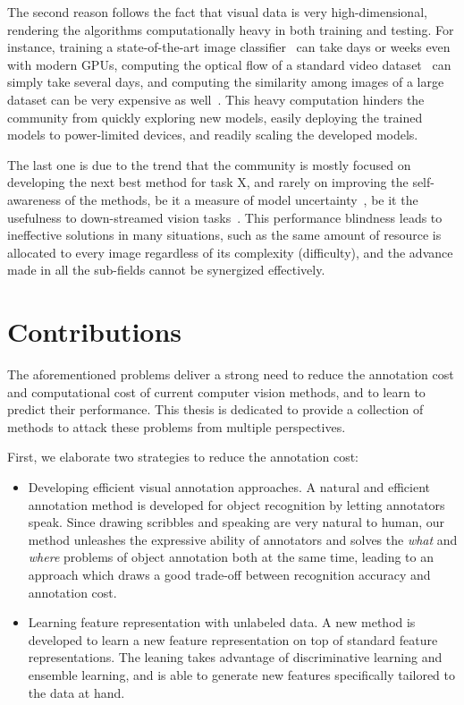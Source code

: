 The second reason follows the fact that visual data is very high-dimensional,  rendering the algorithms computationally heavy in both training and testing. For instance, training a state-of-the-art image classifier~\citep{vgg16, ResNet} can take days or weeks even with modern GPUs,  computing the optical flow of a standard video dataset~\citep{large:video:cnn} can simply take several days,  and computing the similarity among images of a large dataset can be very expensive as well~\citep{Gong_2013_CVPR}. This heavy computation hinders the community from quickly exploring new models,  easily deploying the trained models to power-limited devices, and readily scaling the developed models. 

The last one is due to the trend that the community is mostly focused on developing the next best method for task X, and rarely on improving the self-awareness of the methods, be it  a measure of model uncertainty~\citep{kendall2015bayesian, confidence:of:08},  be it the usefulness to down-streamed vision tasks~\citep{eth_biwi_00883, 15000object}. This performance blindness leads to ineffective solutions in many situations, such as the same amount of resource is allocated to every image regardless of its complexity (difficulty), and the advance made in all the sub-fields cannot be synergized effectively.

\section{Contributions}
The aforementioned problems deliver a strong need to reduce the annotation cost and computational cost of current computer vision methods, and to learn to predict their performance.  This thesis is dedicated to provide a collection of methods to attack these problems from multiple perspectives.  

First, we elaborate two strategies to reduce the annotation cost: 
\begin{itemize}
\item  Developing efficient visual annotation approaches.  A natural and efficient annotation method is developed for object recognition by letting annotators speak.  Since drawing scribbles and speaking are very natural to human,  our method unleashes the expressive ability of annotators and solves the \emph{what} and \emph{where} problems of object annotation both at the same time, leading to an approach which draws a good trade-off between recognition accuracy and annotation cost. 

\item  Learning  feature representation with unlabeled data.  A new method is developed to learn a new feature representation on top of standard feature representations.  The leaning takes advantage of discriminative learning and ensemble learning, and is able to generate new features specifically tailored to the data at hand.  
\end{itemize}

